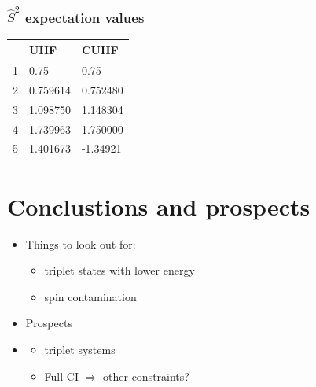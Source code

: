 \documentclass[aspectratio=169]{beamer}
\begin{document}
\begin{frame}
    \frametitle{$\hat{S}^2$ expectation values}
    \begin{table}[h]
        \label{tab:spincon}
        \begin{tabular}{l|l|l}
            & UHF      & CUHF     \\
          \hline
          1 & 0.75     & 0.75     \\
          2 & 0.759614 & 0.752480 \\
          3 & 1.098750 & 1.148304 \\
          4 & 1.739963 & 1.750000 \\
          5 & 1.401673 & -1.34921
        \end{tabular}
      \end{table}
\end{frame}
\section{Conclustions and prospects}
\begin{frame}
    \begin{itemize}
        \item Things to look out for:
        \begin{itemize}
            \item triplet states with lower energy
            \item spin contamination
        \end{itemize}
        \item Prospects
        \item \begin{itemize}
            \item triplet systems
            \item Full CI $\Longrightarrow$ other constraints?
        \end{itemize}
    \end{itemize}
    
\end{frame}

\titleframe
\end{document}

